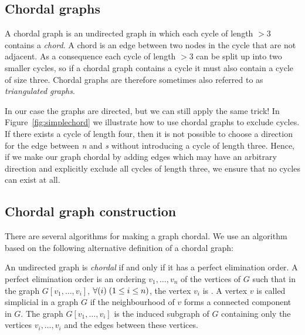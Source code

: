 \documentclass{llncs}
\newcommand{\figref}[1]{Figure~\ref{#1}}
\begin{document}
\subsection{Chordal graphs}
A chordal graph is an undirected graph in which each cycle of length $> 3$ contains a \emph{chord}. A chord is an edge between two nodes in the cycle that are not adjacent. As a consequence each cycle of length $> 3$ can be split up into two smaller cycles, so if a chordal graph contains a cycle it must also contain a cycle of size three. Chordal graphs are therefore sometimes also referred to as \emph{triangulated graphs}.


In our case the graphs are directed, but we can still apply the same trick! In \figref{fig:simplechord} we illustrate how to use chordal graphs to exclude cycles. If there exists a cycle of length four, then it is not possible to choose a direction for the edge between \emph{n} and \emph{s} without introducing a cycle of length three. Hence, if we make our graph chordal by adding edges which may have an arbitrary direction and explicitly exclude all cycles of length three, we ensure that no cycles can exist at all.

\subsection{Chordal graph construction} \label{sect:chordalconstruct}
There are several algorithms for making a graph chordal. We use an algorithm based on the following alternative definition of a chordal graph:

\begin{definition}
An undirected graph is \emph{chordal} if and only if it has a 
perfect elimination order. A perfect elimination order is an
ordering $v_1,\ldots,v_n$ of the vertices of $G$ such that in the graph
$G[v_1,\ldots,v_i]$, $\forall(i)\;(1 \leq i \leq n)$, the vertex $v_i$ is 
. A vertex $v$ is called simplicial in a graph $G$ if
the neighbourhood of $v$ forms a connected component in $G$.
The graph $G[v_1,\ldots,v_i]$ is the induced subgraph of $G$ containing
only the vertices $v_i,\ldots,v_i$ and the edges between these vertices.
\end{definition}
\end{document}
